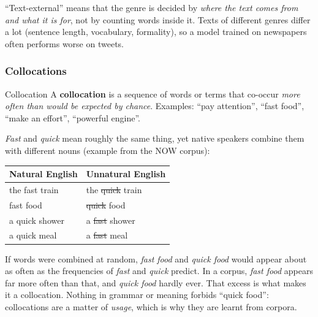 ``Text-external'' means that the genre is decided by \emph{where the text comes from and
what it is for}, not by counting words inside it. Texts of different genres differ a
lot (sentence length, vocabulary, formality), so a model trained on newspapers often
performs worse on tweets.

\subsubsection{Collocations}

\begin{nbdef}{Collocation}
A \textbf{collocation} is a sequence of words or terms that co-occur \emph{more often
than would be expected by chance}. Examples: ``pay attention'', ``fast food'', ``make an
effort'', ``powerful engine''.
\end{nbdef}

\emph{Fast} and \emph{quick} mean roughly the same thing, yet native speakers combine
them with different nouns (example from the NOW corpus):

\begin{center}
\begin{tabular}{@{}l l@{}}
\toprule
\textbf{Natural English} & \textbf{Unnatural English} \\
\midrule
the fast train  & the \sout{quick} train \\
fast food       & \sout{quick} food \\
a quick shower  & a \sout{fast} shower \\
a quick meal    & a \sout{fast} meal \\
\bottomrule
\end{tabular}
\end{center}

\begin{nbintuition}
If words were combined at random, \emph{fast food} and \emph{quick food} would appear
about as often as the frequencies of \emph{fast} and \emph{quick} predict. In a corpus,
\emph{fast food} appears far more often than that, and \emph{quick food} hardly ever.
That excess is what makes it a collocation. Nothing in grammar or meaning forbids
``quick food'': collocations are a matter of \emph{usage}, which is why they are learnt
from corpora.
\end{nbintuition}
